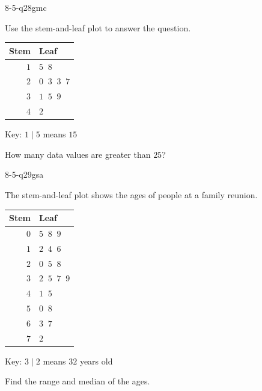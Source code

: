 \begin{practiceQuestion}{8-5-q28}{gmc}
\begin{questionText}
Use the stem-and-leaf plot to answer the question.

\begin{center}
\begin{tabular}{r|l}
\textbf{Stem} & \textbf{Leaf} \\
\hline
$1$ & $5\;\;8$ \\
$2$ & $0\;\;3\;\;3\;\;7$ \\
$3$ & $1\;\;5\;\;9$ \\
$4$ & $2$
\end{tabular}

Key: $1 \mid 5$ means $15$
\end{center}

How many data values are greater than $25$?
\end{questionText}
\end{practiceQuestion}

\begin{practiceQuestion}{8-5-q29}{gsa}
\begin{questionText}
The stem-and-leaf plot shows the ages of people at a family reunion.

\begin{center}
\begin{tabular}{r|l}
\textbf{Stem} & \textbf{Leaf} \\
\hline
$0$ & $5\;\;8\;\;9$ \\
$1$ & $2\;\;4\;\;6$ \\
$2$ & $0\;\;5\;\;8$ \\
$3$ & $2\;\;5\;\;7\;\;9$ \\
$4$ & $1\;\;5$ \\
$5$ & $0\;\;8$ \\
$6$ & $3\;\;7$ \\
$7$ & $2$
\end{tabular}

Key: $3 \mid 2$ means $32$ years old
\end{center}

Find the range and median of the ages.
\end{questionText}
\end{practiceQuestion}

